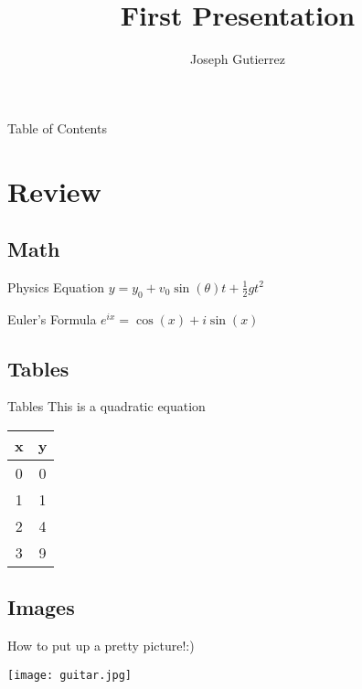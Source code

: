 \documentclass{beamer}
\title{First Presentation}
\author{Joseph Gutierrez}
\institute{University of Texas at El Paso}
\begin{document}
	\maketitle
	\begin{frame}{Table of Contents}
		\tableofcontents 
	\end{frame}
	
	\section{Review}
		\subsection{Math}
			\begin{frame}{Physics Equation}
				$y = y_0 + v_0 \sin(\theta)t + \frac{1}{2}gt^2$
			\end{frame}
			\begin{frame}{Euler's Formula}
				$e^{ix} = \cos(x) + i\sin(x)$
			\end{frame}
		\subsection{Tables}
			\begin{frame}{Tables}
				This is a quadratic equation
				\begin{center} 
					\begin{tabular}{c|c}
							x & y \\
							\hline
							0 & 0 \\
							1 & 1 \\
							2 & 4 \\
							3 & 9 \\
					\end{tabular}
				\end{center}
			\end{frame}
		\subsection{Images}
			\begin{frame}{How to put up a pretty picture!:)}
				\begin{center}
					\texttt{[image: guitar.jpg]}
				\end{center}
			\end{frame}
\end{document}
